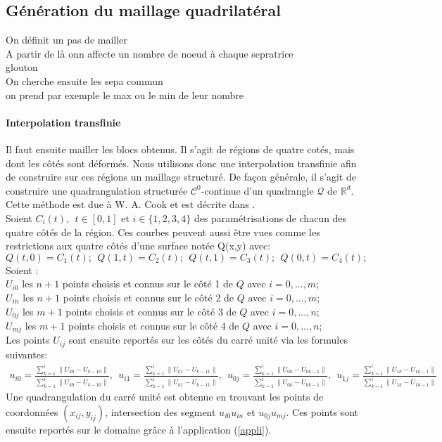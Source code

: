 \subsection{Génération du maillage quadrilatéral}
\label{subsec:gen_mesh_quad}

On définit un pas de mailler\\
A partir de là onn affecte un nombre de noeud à chaque sepratrice\\
glouton\\
On cherche ensuite les sepa commun\\
on prend par exemple le max ou le min de leur nombre\\

\paragraph{Interpolation transfinie}

Il faut ensuite mailler les blocs obtenus. Il s'agit de régions de quatre cotés, mais dont les côtés sont déformés. Nous utilisons donc une interpolation transfinie afin de construire sur ces régions un maillage structuré. De façon générale, il s'agit de construire une quadrangulation structurée $\mathcal{C}^0$-continue d'un quadrangle $\mathcal{Q}$ de $\mathbb{R}^d$. Cette méthode est due à W. A. Cook \cite{ref4} et est décrite dans \cite{ref5}.\\
Soient $C_i(t),~~t\in[0,1]$ et $i\in\{1,2,3,4\}$ des paramétrisations de chacun des quatre côtés de la région. Ces courbes peuvent aussi être vues comme les restrictions aux quatre côtés d'une surface notée Q(x,y) avec:
$$Q(t,0)=C_1(t);~~Q(1,t)=C_2(t);~~Q(t,1)=C_3(t);~~Q(0,t)=C_4(t);$$
Soient :\\
$U_{i0}$ les $n+1$ points choisis et connus sur le côté 1 de $Q$ avec $i=0,...,m$;\\
$U_{in}$ les $n+1$ points choisis et connus sur le côté 2 de $Q$ avec $i=0,...,m$;\\
$U_{0j}$ les $m+1$ points choisis et connus sur le côté 3 de $Q$ avec $i=0,...,n$;\\
$U_{mj}$ les $m+1$ points choisis et connus sur le côté 4 de $Q$ avec $i=0,...,n$;\\
Les points $U_{ij}$ sont ensuite reportés sur les côtés du carré unité via les formules suivantes:
\tiny
\begin{eqnarray}
u_{i0}=\displaystyle\frac{\displaystyle\sum_{k=1}^i\|U_{k0}-U_{k-10}\|}{\displaystyle\sum_{k=1}^i\|U_{k0}-U_{k-10}\|},~~u_{i1}=\displaystyle\frac{\displaystyle\sum_{k=1}^i\|U_{k1}-U_{k-11}\|}{\displaystyle\sum_{k=1}^i\|U_{k1}-U_{k-11}\|},~~u_{0j}=\displaystyle\frac{\displaystyle\sum_{k=1}^i\|U_{0k}-U_{0k-1}\|}{\displaystyle\sum_{k=1}^i\|U_{0k}-U_{0k-1}\|},~~u_{1j}=\displaystyle\frac{\displaystyle\sum_{k=1}^i\|U_{1k}-U_{1k-1}\|}{\displaystyle\sum_{k=1}^i\|U_{1k}-U_{1k-1}\|}
\end{eqnarray}
\normalsize
Une quadrangulation du carré unité est obtenue en trouvant les points de coordonnées $(x_{ij},y_{ij})$, intersection des segment $u_{i0}u_{in}$ et $u_{0j}u_{mj}$. Ces points sont ensuite reportés sur le domaine grâce à l'application (\ref{appli}).

